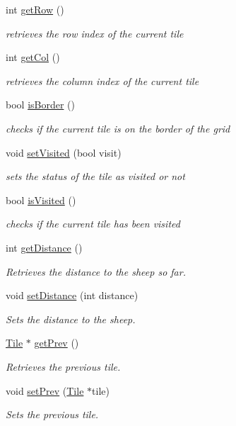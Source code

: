 \begin{DoxyCompactItemize}
int \hyperlink{classTile_ac89b02b6a3735fdfccdcf90515febcd0}{get\-Row} ()
\begin{DoxyCompactList}\small\item\em retrieves the row index of the current tile \end{DoxyCompactList}\item 
int \hyperlink{classTile_a45d72d9141a1ef9b5a4c482595b067cd}{get\-Col} ()
\begin{DoxyCompactList}\small\item\em retrieves the column index of the current tile \end{DoxyCompactList}\item 
bool \hyperlink{classTile_af736a00b952f5b7893d1751049572c27}{is\-Border} ()
\begin{DoxyCompactList}\small\item\em checks if the current tile is on the border of the grid \end{DoxyCompactList}\item 
void \hyperlink{classTile_acb96f0fb719b9f5b9a94ba9e721d6073}{set\-Visited} (bool visit)
\begin{DoxyCompactList}\small\item\em sets the status of the tile as visited or not \end{DoxyCompactList}\item 
bool \hyperlink{classTile_a980db52575b7707886daaf3fcb925bb7}{is\-Visited} ()
\begin{DoxyCompactList}\small\item\em checks if the current tile has been visited \end{DoxyCompactList}\item 
int \hyperlink{classTile_ab2da6ab1fd6ee07cfae1f4231c2cca6a}{get\-Distance} ()
\begin{DoxyCompactList}\small\item\em \-Retrieves the distance to the sheep so far. \end{DoxyCompactList}\item 
void \hyperlink{classTile_ad4c98d62f7ac3912075c5ba53cb7c1c6}{set\-Distance} (int distance)
\begin{DoxyCompactList}\small\item\em \-Sets the distance to the sheep. \end{DoxyCompactList}\item 
\hyperlink{classTile}{\-Tile} $\ast$ \hyperlink{classTile_a465a5a48f021f97e29d977c6c0089299}{get\-Prev} ()
\begin{DoxyCompactList}\small\item\em \-Retrieves the previous tile. \end{DoxyCompactList}\item 
void \hyperlink{classTile_aa734bc3878b263a0666efab0ff960f5a}{set\-Prev} (\hyperlink{classTile}{\-Tile} $\ast$tile)
\begin{DoxyCompactList}\small\item\em \-Sets the previous tile. \end{DoxyCompactList}\end{DoxyCompactItemize}


